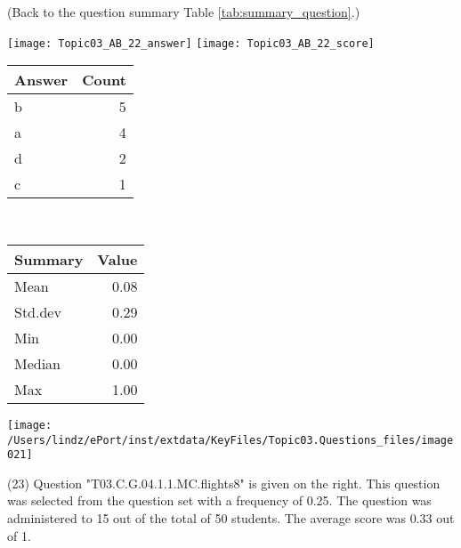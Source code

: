 \documentclass[12pt,english,nohyper]{tufte-handout}\usepackage[]{graphicx}\usepackage[]{color}
\begin{document}
 (Back to the question summary Table \ref{tab:summary_question}.)

\begin{center} \texttt{[image: Topic03\_AB\_22\_answer]} \texttt{[image: Topic03\_AB\_22\_score]} \end{center} 

\begin{center}%
\begin{tabular}{lr}
  \hline
Answer & Count \\ 
  \hline
b &   5 \\ 
  a &   4 \\ 
  d &   2 \\ 
  c &   1 \\ 
   \hline
\end{tabular}
~~~~~~~~%
\begin{tabular}{lr}
  \hline
Summary & Value \\ 
  \hline
Mean & 0.08 \\ 
  Std.dev & 0.29 \\ 
  Min & 0.00 \\ 
  Median & 0.00 \\ 
  Max & 1.00 \\ 
   \hline
\end{tabular}
\end{center}\newpage{}



\vspace{4cm}\begin{marginfigure}\texttt{[image: /Users/lindz/ePort/inst/extdata/KeyFiles/Topic03.Questions\_files/image021]}\end{marginfigure}\vspace{-4cm} (23) Question "T03.C.G.04.1.1.MC.flights8" is given on the right. This question was selected from the question set with a frequency of 0.25. The question was administered to 15 out of the total of 50 students. The average score was 0.33 out of 1.
\end{document}
